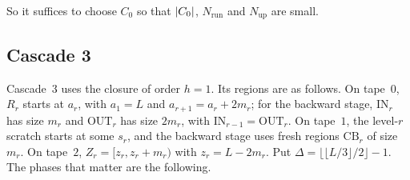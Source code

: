 So it suffices to choose $C_0$ so that $\lvert C_0 \rvert$, $N_{\mathrm{run}}$ and $N_{\mathrm{up}}$ are small.

\subsection{Cascade 3}\label{app:cascade3}

Cascade~3 uses the closure of order $h=1$. Its regions are as follows. On tape~$0$, $R_r$ starts at $a_r$, with $a_1=L$ and
$a_{r+1}=a_r+2m_r$; for the backward stage, $\mathrm{IN}_r$ has size $m_r$ and $\mathrm{OUT}_r$ has size $2m_r$, with
$\mathrm{IN}_{r-1}=\mathrm{OUT}_r$. On tape~$1$, the level-$r$ scratch starts at some $s_r$, and the backward stage uses fresh regions
$\mathrm{CB}_r$ of size $m_r$. On tape~$2$, $Z_r=[z_r,z_r+m_r)$ with $z_r=L-2m_r$. Put $\Delta=\lfloor\lfloor L/3\rfloor/2\rfloor-1$. The
phases that matter are the following.

